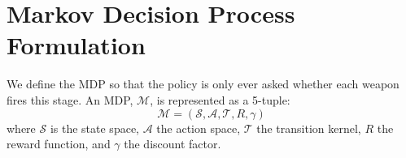 \section{Markov Decision Process Formulation}
\label{sec:mdp}

We define the MDP so that the policy is only ever asked whether each weapon fires this stage. An MDP, $\mathcal{M}$, is represented as a 5-tuple:
\begin{equation}
\mathcal{M} = (\mathcal{S}, \mathcal{A}, \mathcal{T}, R, \gamma)
\end{equation}
where $\mathcal{S}$ is the state space, $\mathcal{A}$ the action space,
$\mathcal{T}$ the transition kernel, $R$ the reward function, and $\gamma$
the discount factor.


